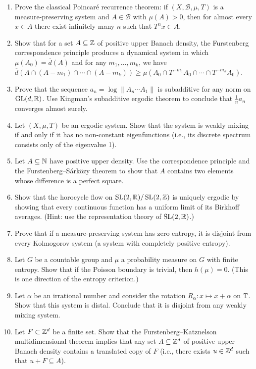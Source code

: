 \begin{enumerate}
    \item [B] Prove the classical Poincar\'e recurrence theorem: if \((X,\mathscr{B},\mu,T)\) is a measure-preserving system and \(A \in \mathscr{B}\) with \(\mu(A) > 0\), then for almost every \(x \in A\) there exist infinitely many \(n\) such that \(T^n x \in A\).
    \item [I] Show that for a set \(A \subseteq \mathbb{Z}\) of positive upper Banach density, the Furstenberg correspondence principle produces a dynamical system in which \(\mu(A_0) = \overline{d}(A)\) and for any \(m_1,\dots,m_k\), we have \(\overline{d}(A \cap (A-m_1) \cap \cdots \cap (A-m_k)) \geq \mu(A_0 \cap T^{-m_1}A_0 \cap \cdots \cap T^{-m_k}A_0)\).
    \item [I] Prove that the sequence \(a_n = \log\|A_n \cdots A_1\|\) is subadditive for any norm on \(\operatorname{GL}(d,\mathbb{R})\). Use Kingman's subadditive ergodic theorem to conclude that \(\frac{1}{n}a_n\) converges almost surely.
    \item [I] Let \((X,\mu,T)\) be an ergodic system. Show that the system is weakly mixing if and only if it has no non-constant eigenfunctions (i.e., its discrete spectrum consists only of the eigenvalue 1).
    \item [I] Let \(A \subseteq \mathbb{N}\) have positive upper density. Use the correspondence principle and the Furstenberg--S\'ark\"ozy theorem to show that \(A\) contains two elements whose difference is a perfect square.
    \item [A] Show that the horocycle flow on \(\operatorname{SL}(2,\mathbb{R})/\operatorname{SL}(2,\mathbb{Z})\) is uniquely ergodic by showing that every continuous function has a uniform limit of its Birkhoff averages. (Hint: use the representation theory of \(\operatorname{SL}(2,\mathbb{R})\).)
    \item [I] Prove that if a measure-preserving system has zero entropy, it is disjoint from every Kolmogorov system (a system with completely positive entropy).
    \item [I] Let \(G\) be a countable group and \(\mu\) a probability measure on \(G\) with finite entropy. Show that if the Poisson boundary is trivial, then \(h(\mu) = 0\). (This is one direction of the entropy criterion.)
    \item [I] Let \(\alpha\) be an irrational number and consider the rotation \(R_\alpha: x \mapsto x + \alpha\) on \(\mathbb{T}\). Show that this system is distal. Conclude that it is disjoint from any weakly mixing system.
    \item [I] Let \(F \subset \mathbb{Z}^d\) be a finite set. Show that the Furstenberg--Katznelson multidimensional theorem implies that any set \(A \subseteq \mathbb{Z}^d\) of positive upper Banach density contains a translated copy of \(F\) (i.e., there exists \(u \in \mathbb{Z}^d\) such that \(u + F \subseteq A\)).

\end{enumerate}
